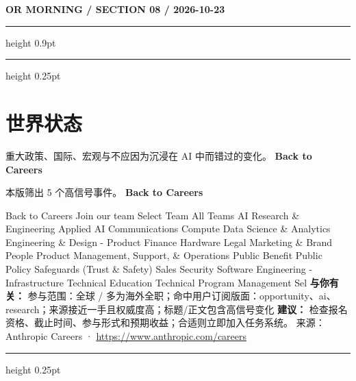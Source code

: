 \documentclass[10.5pt]{ctexart}
\begin{document}
\newpage
{\small\bfseries OR MORNING / SECTION 08 / 2026-10-23}
\vspace{2mm}
\hrule height 0.9pt
\vspace{1.5mm}
\hrule height 0.25pt
\vspace{4mm}
\section*{世界状态}
{\color{ormuted} 重大政策、国际、宏观与不应因为沉浸在 AI 中而错过的变化。}
\vspace{2mm}
{\LARGE\bfseries Back to Careers}\par
\vspace{1mm}
{\color{ormuted} 本版筛出 5 个高信号事件。}
\vspace{3mm}
{\Large\bfseries Back to Careers}\par
Back to Careers Join our team Select Team All Teams AI Research \& Engineering Applied AI Communications Compute Data Science \& Analytics Engineering \& Design - Product Finance Hardware Legal Marketing \& Brand People Product Management, Support, \& Operations Public Benefit Public Policy Safeguards (Trust \& Safety) Sales Security Software Engineering - Infrastructure Technical Education Technical Program Management Sel
\textbf{与你有关：} 参与范围：全球 / 多为海外全职；命中用户订阅版面：opportunity、ai、research；来源接近一手且权威度高；标题/正文包含高信号变化
\textbf{建议：} 检查报名资格、截止时间、参与形式和预期收益；合适则立即加入任务系统。
{\footnotesize\color{ormuted} 来源：Anthropic Careers · \url{https://www.anthropic.com/careers}}
\vspace{4mm}
\hrule height 0.25pt
\vspace{3mm}
\end{document}
